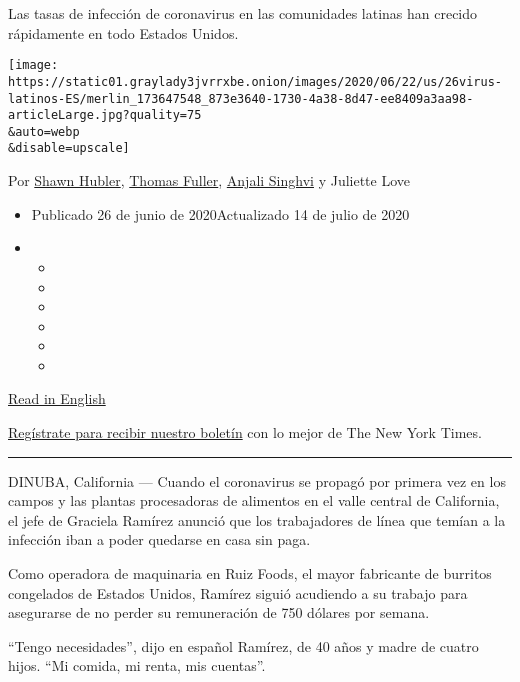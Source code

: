 Las tasas de infección de coronavirus en las comunidades latinas han
crecido rápidamente en todo Estados Unidos.

\texttt{[image: https://static01.graylady3jvrrxbe.onion/images/2020/06/22/us/26virus-latinos-ES/merlin\_173647548\_873e3640-1730-4a38-8d47-ee8409a3aa98-articleLarge.jpg?quality=75\\\&auto=webp\\\&disable=upscale]}

Por \href{https://www.nytimes3xbfgragh.onion/by/shawn-hubler}{Shawn
Hubler},
\href{https://www.nytimes3xbfgragh.onion/by/thomas-fuller}{Thomas
Fuller},
\href{https://www.nytimes3xbfgragh.onion/by/anjali-singhvi}{Anjali
Singhvi} y Juliette Love

\begin{itemize}
\item
  Publicado 26 de junio de 2020Actualizado 14 de julio de 2020
\item
  \begin{itemize}
  \item
  \item
  \item
  \item
  \item
  \item
  \end{itemize}
\end{itemize}

\href{https://www.nytimes3xbfgragh.onion/2020/06/26/us/corona-virus-latinos.html}{Read
in English}

\href{https://www.nytimes3xbfgragh.onion/newsletters/el-times}{Regístrate
para recibir nuestro boletín} con lo mejor de The New York Times.

\begin{center}\rule{0.5\linewidth}{\linethickness}\end{center}

DINUBA, California --- Cuando el coronavirus se propagó por primera vez
en los campos y las plantas procesadoras de alimentos en el valle
central de California, el jefe de Graciela Ramírez anunció que los
trabajadores de línea que temían a la infección iban a poder quedarse en
casa sin paga.

Como operadora de maquinaria en Ruiz Foods, el mayor fabricante de
burritos congelados de Estados Unidos, Ramírez siguió acudiendo a su
trabajo para asegurarse de no perder su remuneración de 750 dólares por
semana.

``Tengo necesidades'', dijo en español Ramírez, de 40 años y madre de
cuatro hijos. ``Mi comida, mi renta, mis cuentas''.


